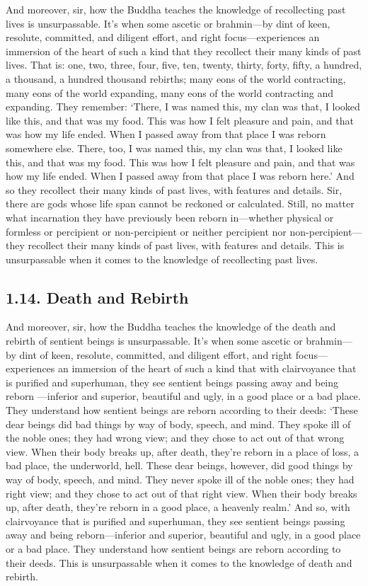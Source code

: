 \documentclass[12pt,openany]{book}%
\begin{document}
And moreover, sir, how the Buddha teaches the knowledge of recollecting past lives is unsurpassable. It’s when some ascetic or brahmin—by dint of keen, resolute, committed, and diligent effort, and right focus—experiences an immersion of the heart of such a kind that they recollect their many kinds of past lives. That is: one, two, three, four, five, ten, twenty, thirty, forty, fifty, a hundred, a thousand, a hundred thousand rebirths; many eons of the world contracting, many eons of the world expanding, many eons of the world contracting and expanding. They remember: ‘There, I was named this, my clan was that, I looked like this, and that was my food. This was how I felt pleasure and pain, and that was how my life ended. When I passed away from that place I was reborn somewhere else. There, too, I was named this, my clan was that, I looked like this, and that was my food. This was how I felt pleasure and pain, and that was how my life ended. When I passed away from that place I was reborn here.’ And so they recollect their many kinds of past lives, with features and details. Sir, there are gods whose life span cannot be reckoned or calculated. Still, no matter what incarnation they have previously been reborn in—whether physical or formless or percipient or non-percipient or neither percipient nor non-percipient—they recollect their many kinds of past lives, with features and details. This is unsurpassable when it comes to the knowledge of recollecting past lives. 

\subsection*{1.14. Death and Rebirth }

And moreover, sir, how the Buddha teaches the knowledge of the death and rebirth of sentient beings is unsurpassable. It’s when some ascetic or brahmin—by dint of keen, resolute, committed, and diligent effort, and right focus—experiences an immersion of the heart of such a kind that with clairvoyance that is purified and superhuman, they see sentient beings passing away and being reborn —inferior and superior, beautiful and ugly, in a good place or a bad place. They understand how sentient beings are reborn according to their deeds: ‘These dear beings did bad things by way of body, speech, and mind. They spoke ill of the noble ones; they had wrong view; and they chose to act out of that wrong view. When their body breaks up, after death, they’re reborn in a place of loss, a bad place, the underworld, hell. These dear beings, however, did good things by way of body, speech, and mind. They never spoke ill of the noble ones; they had right view; and they chose to act out of that right view. When their body breaks up, after death, they’re reborn in a good place, a heavenly realm.’ And so, with clairvoyance that is purified and superhuman, they see sentient beings passing away and being reborn—inferior and superior, beautiful and ugly, in a good place or a bad place. They understand how sentient beings are reborn according to their deeds. This is unsurpassable when it comes to the knowledge of death and rebirth. 
\end{document}
